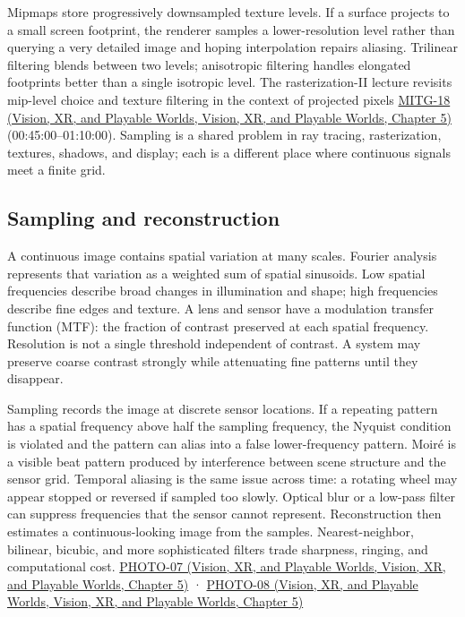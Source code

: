 Mipmaps store progressively downsampled texture levels. If a surface projects to a small screen footprint, the renderer samples a lower-resolution level rather than querying a very detailed image and hoping interpolation repairs aliasing. Trilinear filtering blends between two levels; anisotropic filtering handles elongated footprints better than a single isotropic level. The rasterization-II lecture revisits mip-level choice and texture filtering in the context of projected pixels \href{../07-Vision-XR-and-Playable-Worlds/main.pdf\#nameddest=04-visual-computing-ii-ch036-mitg-18---rasterization-ii}{MITG-18 (Vision, XR, and Playable Worlds, Vision, XR, and Playable Worlds, Chapter 5)} (00:45:00--01:10:00). Sampling is a shared problem in ray tracing, rasterization, textures, shadows, and display; each is a different place where continuous signals meet a finite grid.

\subsection{Sampling and reconstruction}\label{03-visual-computing-i-ch003-sampling-and-reconstruction}

A continuous image contains spatial variation at many scales. Fourier analysis represents that variation as a weighted sum of spatial sinusoids. Low spatial frequencies describe broad changes in illumination and shape; high frequencies describe fine edges and texture. A lens and sensor have a modulation transfer function (MTF): the fraction of contrast preserved at each spatial frequency. Resolution is not a single threshold independent of contrast. A system may preserve coarse contrast strongly while attenuating fine patterns until they disappear.

Sampling records the image at discrete sensor locations. If a repeating pattern has a spatial frequency above half the sampling frequency, the Nyquist condition is violated and the pattern can alias into a false lower-frequency pattern. Moiré is a visible beat pattern produced by interference between scene structure and the sensor grid. Temporal aliasing is the same issue across time: a rotating wheel may appear stopped or reversed if sampled too slowly. Optical blur or a low-pass filter can suppress frequencies that the sensor cannot represent. Reconstruction then estimates a continuous-looking image from the samples. Nearest-neighbor, bilinear, bicubic, and more sophisticated filters trade sharpness, ringing, and computational cost. \href{../07-Vision-XR-and-Playable-Worlds/main.pdf\#nameddest=04-visual-computing-ii-ch036-photo-07---photography-session-07}{PHOTO-07 (Vision, XR, and Playable Worlds, Vision, XR, and Playable Worlds, Chapter 5)} · \href{../07-Vision-XR-and-Playable-Worlds/main.pdf\#nameddest=04-visual-computing-ii-ch036-photo-08---photography-session-08}{PHOTO-08 (Vision, XR, and Playable Worlds, Vision, XR, and Playable Worlds, Chapter 5)}

